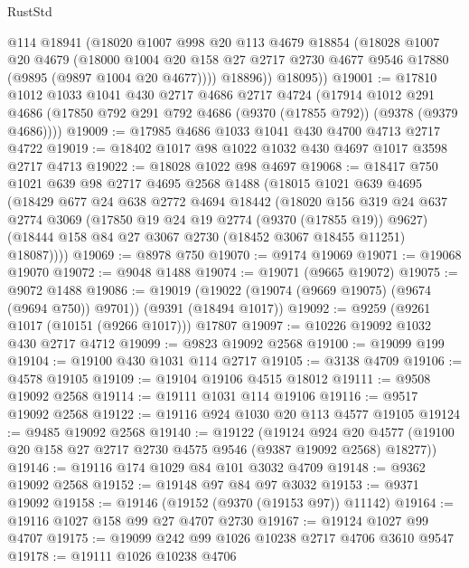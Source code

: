 \begin{lexlean}{RustStd}
\begin{coremodule}
          @114
          @18941
          (@18020
            @1007
            @998
            @20
            @113
            @4679
            @18854
            (@18028
              @1007
              @20
              @4679
              (@18000
                @1004
                @20
                @158
                @27
                @2717
                @2730
                @4677
                @9546
                @17880
                (@9895 (@9897 @1004 @20 @4677))))
            @18896))
        @18095))
@19001 := @17810
    @1012
    @1033
    @1041
    @430
    @2717
    @4686
    @2717
    @4724
    (@17914
      @1012
      @291
      @4686
      (@17850 @792 @291 @792 @4686 (@9370 (@17855 @792)) (@9378 (@9379 @4686))))
@19009 := @17985 @4686 @1033 @1041 @430 @4700 @4713 @2717 @4722
@19019 := @18402 @1017 @98 @1022 @1032 @430 @4697 @1017 @3598 @2717 @4713
@19022 := @18028 @1022 @98 @4697
@19068 := @18417
    @750
    @1021
    @639
    @98
    @2717
    @4695
    @2568
    @1488
    (@18015
      @1021
      @639
      @4695
      (@18429
        @677
        @24
        @638
        @2772
        @4694
        @18442
        (@18020
          @156
          @319
          @24
          @637
          @2774
          @3069
          (@17850 @19 @24 @19 @2774 (@9370 (@17855 @19)) @9627)
          (@18444 @158 @84 @27 @3067 @2730 (@18452 @3067 @18455 @11251) @18087))))
@19069 := @8978 @750
@19070 := @9174 @19069
@19071 := @19068 @19070
@19072 := @9048 @1488
@19074 := @19071 (@9665 @19072)
@19075 := @9072 @1488
@19086 := @19019 (@19022 (@19074 (@9669 @19075) (@9674 (@9694 @750)) @9701)) (@9391 (@18494 @1017))
@19092 := @9259 (@9261 @1017 (@10151 (@9266 @1017))) @17807
@19097 := @10226 @19092 @1032 @430 @2717 @4712
@19099 := @9823 @19092 @2568
@19100 := @19099 @199
@19104 := @19100 @430 @1031 @114 @2717
@19105 := @3138 @4709
@19106 := @4578 @19105
@19109 := @19104 @19106 @4515 @18012
@19111 := @9508 @19092 @2568
@19114 := @19111 @1031 @114 @19106
@19116 := @9517 @19092 @2568
@19122 := @19116 @924 @1030 @20 @113 @4577 @19105
@19124 := @9485 @19092 @2568
@19140 := @19122
    (@19124
      @924
      @20
      @4577
      (@19100 @20 @158 @27 @2717 @2730 @4575 @9546 (@9387 @19092 @2568) @18277))
@19146 := @19116 @174 @1029 @84 @101 @3032 @4709
@19148 := @9362 @19092 @2568
@19152 := @19148 @97 @84 @97 @3032
@19153 := @9371 @19092
@19158 := @19146 (@19152 (@9370 (@19153 @97)) @11142)
@19164 := @19116 @1027 @158 @99 @27 @4707 @2730
@19167 := @19124 @1027 @99 @4707
@19175 := @19099 @242 @99 @1026 @10238 @2717 @4706 @3610 @9547
@19178 := @19111 @1026 @10238 @4706

\end{coremodule}
\end{lexlean}
